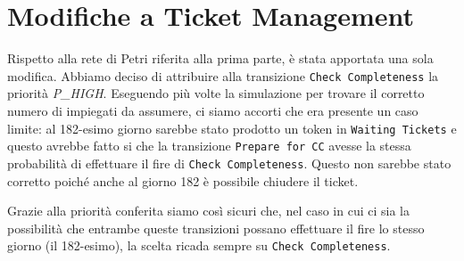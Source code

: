 \documentclass[../Relazione.tex]{subfiles}
\begin{document}
\section{Modifiche a Ticket Management}
    Rispetto alla rete di Petri riferita alla prima parte, è stata apportata una sola modifica.
    Abbiamo deciso di attribuire alla transizione \texttt{Check Completeness} la priorità \textit{P\_HIGH}. Eseguendo più volte la simulazione per trovare il corretto numero di impiegati da assumere, ci siamo accorti che era presente un caso limite: al 182-esimo giorno sarebbe stato prodotto un token in \texttt{Waiting Tickets} e questo avrebbe fatto si che la transizione \texttt{Prepare for CC} avesse la stessa probabilità di effettuare il fire di \texttt{Check Completeness}. Questo non sarebbe stato corretto poiché anche al giorno 182 è possibile chiudere il ticket.
    
    Grazie alla priorità conferita siamo così sicuri che, nel caso in cui ci sia la possibilità che entrambe queste transizioni possano effettuare il fire lo stesso giorno (il 182-esimo), la scelta ricada sempre su \texttt{Check Completeness}.
        
         
\end{document}
